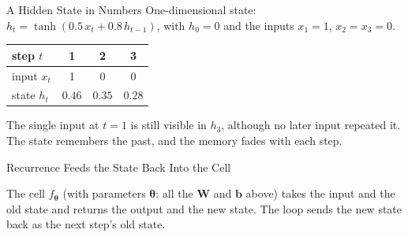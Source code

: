 \documentclass{ntuabeamer}
\begin{document}
\begin{frame}{A Hidden State in Numbers}
  One-dimensional state: $h_t=\tanh(0.5\,x_t+0.8\,h_{t-1})$, with $h_0=0$ and the inputs $x_1=1$, $x_2=x_3=0$.
  \begin{center}
    \begin{tabular}{lccc}
      \toprule
      step $t$ & 1 & 2 & 3\\
      \midrule
      input $x_t$ & 1 & 0 & 0\\
      state $h_t$ & $0.46$ & $0.35$ & $0.28$\\
      \bottomrule
    \end{tabular}
  \end{center}
  The single input at $t=1$ is still visible in $h_3$, although no later input repeated it.
  The state remembers the past, and the memory fades with each step.
\end{frame}

\begin{frame}{Recurrence Feeds the State Back Into the Cell}
  \centering

  \vspace{0.2cm}
  The cell $f_{\boldsymbol\theta}$ (with parameters $\boldsymbol\theta$: all the $\mathbf W$ and $\mathbf b$ above) takes the input and the old state and returns the output and the new state.
  The loop sends the new state back as the next step's old state.
\end{frame}
\end{document}
